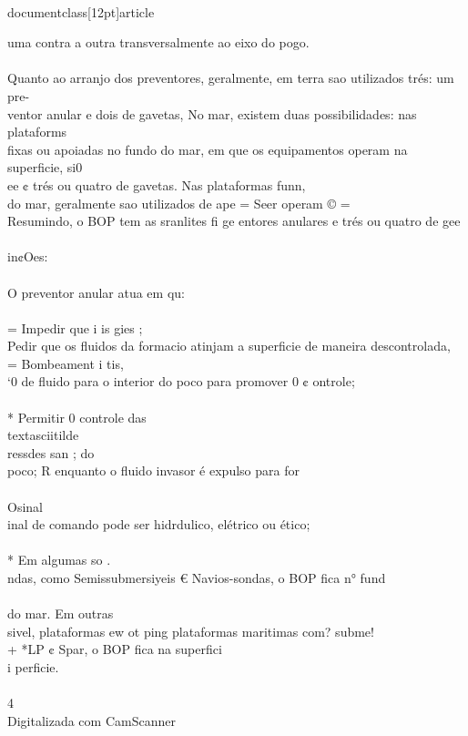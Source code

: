 \\documentclass[12pt]{article}
\begin{document}
uma contra a outra transversalmente ao eixo do pogo.\\
\\
Quanto ao arranjo dos preventores, geralmente, em terra sao utilizados trés: um pre-\\
ventor anular e dois de gavetas, No mar, existem duas possibilidades: nas plataforms\\
fixas ou apoiadas no fundo do mar, em que os equipamentos operam na superficie, si0\\
ee ¢ trés ou quatro de gavetas. Nas plataformas funn,\\
do mar, geralmente sao utilizados de ape = Seer operam © =\\
Resumindo, o BOP tem as sranlites fi ge entores anulares e trés ou quatro de gee\\
\\
in¢Oes:\\
\\
O preventor anular atua em qu:\\
\\
= Impedir que i is gies ;\\
Pedir que os fluidos da formacio atinjam a superficie de maneira descontrolada,\\
= Bombeament i tis,\\
‘0 de fluido para o interior do poco para promover 0 ¢ ontrole;\\
\\
* Permitir 0 controle das \\textasciitilde{}\\
ressdes san ; do\\
poco; R enquanto o fluido invasor é expulso para for\\
\\
Osinal\\
inal de comando pode ser hidrdulico, elétrico ou ético;\\
\\
* Em algumas so .\\
ndas, como Semissubmersiyeis € Navios-sondas, o BOP fica n° fund\\
\\
do mar. Em outras\\
sivel, plataformas ew ot ping plataformas maritimas com? subme!\\
+ *LP ¢ Spar, o BOP fica na superfici\\
i perficie.\\
\\
4\\
Digitalizada com CamScanner\\
\end{document}
